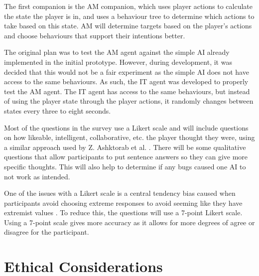 \documentclass{IEEEtran}
\begin{document}
The first companion is the AM companion, which uses player actions to calculate the state the player is in, and uses a behaviour tree to determine which actions to take based on this state. AM will determine targets based on the player's actions and choose behaviours that support their intentions better.

The original plan was to test the AM agent against the simple AI already implemented in the initial prototype. However, during development, it was decided that this would not be a fair experiment as the simple AI does not have access to the same behaviours. As such, the IT agent was developed to properly test the AM agent. The IT agent has access to the same behaviours, but instead of using the player state through the player actions, it randomly changes between states every three to eight seconds.

Most of the questions in the survey use a Likert scale and will include questions on how likeable, intelligent, collaborative, etc. the player thought they were, using a similar approach used by Z. Ashktorab et al. \cite{SocialPerceptions2020}. There will be some qualitative questions that allow participants to put sentence answers so they can give more specific thoughts. This will also help to determine if any bugs caused one AI to not work as intended.


One of the issues with a Likert scale is a central tendency bias caused when participants avoid choosing extreme responses to avoid seeming like they have extremist values \cite{taherdoost2019best}. To reduce this, the questions will use a 7-point Likert scale. Using a 7-point scale gives more accuracy as it allows for more degrees of agree or disagree for the participant.

\section{Ethical Considerations}
\label{EthicalConsiderations}

\end{document}

